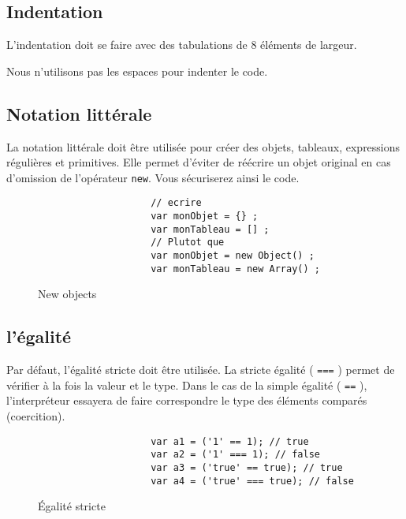 		\subsection{Indentation}
			L'indentation doit se faire avec des tabulations de 8 éléments de largeur.

			Nous n'utilisons pas les espaces pour indenter le code.

		\subsection{Notation littérale}
			La notation littérale doit être utilisée pour créer des objets, tableaux, expressions régulières et primitives. Elle permet d'éviter de réécrire un objet original en cas d'omission de l'opérateur \verb+new+. Vous sécuriserez ainsi le code.

			\begin{figure}[H]
				\begin{changemargin}{-2.5cm}{-2.5cm}
				\begin{tcolorbox}
				\begin{verbatim}
					// ecrire
					var monObjet = {} ;
					var monTableau = [] ;
					// Plutot que
					var monObjet = new Object() ;
					var monTableau = new Array() ;
				\end{verbatim}
				\end{tcolorbox}
				\end{changemargin}
				\caption{New objects}
			\end{figure}

		\subsection{l'égalité}
			Par défaut, l'égalité stricte doit être utilisée. La stricte égalité ( \verb+===+ ) permet de vérifier à la fois la valeur et le type. Dans le cas de la simple égalité ( \verb+==+ ), l'interpréteur essayera de faire correspondre le type des éléments comparés (coercition).

			\begin{figure}[H]
				\begin{changemargin}{-2.5cm}{-2.5cm}
				\begin{tcolorbox}
				\begin{verbatim}
					var a1 = ('1' == 1); // true
					var a2 = ('1' === 1); // false
					var a3 = ('true' == true); // true
					var a4 = ('true' === true); // false
				\end{verbatim}
				\end{tcolorbox}
				\end{changemargin}
				\caption{\'Egalité stricte}
			\end{figure}


